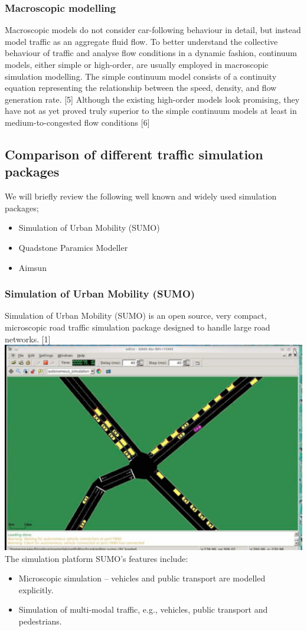 \subsubsection{Macroscopic modelling}
	Macroscopic models do not consider car-following behaviour in detail, but instead model traffic as an aggregate fluid flow. To better understand the collective behaviour of traffic and analyse flow conditions in a dynamic fashion, continuum models, either simple or high-order, are usually employed in macroscopic simulation modelling. The simple continuum model consists of a continuity equation representing the relationship between the speed, density, and flow generation rate. [5] Although the existing high-order models look promising, they have not as yet proved truly superior to the simple continuum models at least in medium-to-congested flow conditions [6]
\subsection{Comparison of different traffic simulation packages}
	We will briefly review the following well known and widely used simulation packages;
	
	\begin{itemize}
		\item Simulation of Urban Mobility (SUMO)
		\item Quadstone Paramics Modeller
		\item Aimsun
	\end{itemize}

\subsubsection{Simulation of Urban Mobility (SUMO)}
	Simulation of Urban Mobility (SUMO) is an open source, very compact, microscopic road traffic simulation package designed to handle large road networks. [1]
	\includegraphics[scale=0.7]{./images/SUMO.png}
	The simulation platform SUMO's features include:
	\begin{itemize}
		\item Microscopic simulation – vehicles and public transport are modelled explicitly.
		\item Simulation of multi-modal traffic, e.g., vehicles, public transport and pedestrians.
	\end{itemize}

